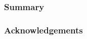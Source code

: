 \documentclass{beamer}
\begin{document}
%
%
\begin{frame}
  \frametitle{Summary}
\end{frame}

\begin{frame}
  \frametitle{Acknowledgements}
\end{frame}
\end{document}
